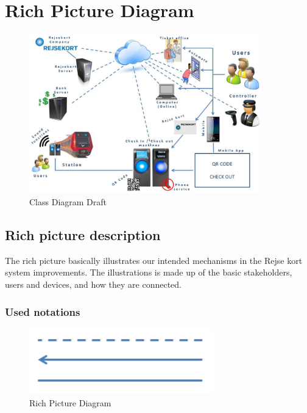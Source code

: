 \renewcommand{\headrulewidth}{0.1pt}
\renewcommand{\footrulewidth}{0.1pt}

\section*{Rich Picture Diagram}

\begin{figure}[ht!]
\centering
\includegraphics[width=100mm]{graphics/Rejse_Kort_Rich_Picture_2nd.jpg}
\caption{Class Diagram Draft}
\label{overflow}
\end{figure}

\subsection*{Rich picture description}

The rich picture basically illustrates our intended mechanisms in the Rejse kort system improvements. The illustrations is made up of the basic stakeholders, users and devices, and how they are connected.

\subsubsection*{Used notations}
\begin{figure}[ht!]
\centering
\includegraphics[width=80mm]{graphics/rich_pic_histrogram.png}
\caption{Rich Picture Diagram}
\label{overflow}
\end{figure}

